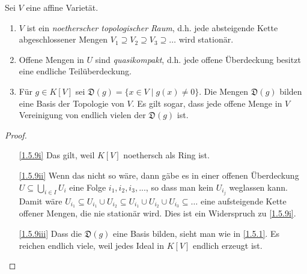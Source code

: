 \documentclass[a4paper,12pt]{scrbook}
\newtheorem{proof}{Beweis}
\newcommand{\D}{\mathfrak{D}}
\renewcommand{\dotsc}{\ensuremath{\!...}}
\begin{document}
\begin{bem}\label{1.5.9}
  Sei $V$ eine affine Varietät.
  \begin{enumerate}
  \item{} $V$ ist ein \emph{noetherscher topologischer Raum}, d.h. jede absteigende Kette abgeschlossener Mengen
    $V_1\supseteq V_2\supseteq V_3\supseteq\dotso$ wird stationär.
  \item{} Offene Mengen in $U$ sind \emph{quasikompakt}, d.h. jede offene Überdeckung besitzt eine endliche
    Teilüberdeckung.
  \item{} Für $g\in K[V]$ sei $\D(g)=\{x\in V\mid g(x)\neq0\}$. Die Mengen $\D(g)$ bilden eine Basis der Topologie
    von $V$. Es gilt sogar, dass jede offene Menge in $V$ Vereinigung von endlich vielen der $\D(g)$ ist.
  \end{enumerate}
\end{bem}
\begin{proof}
  \begin{enumerate}
  \item[\ref{1.5.9i}] Das gilt, weil $K[V]$ noethersch als Ring ist.
  \item[\ref{1.5.9ii}] Wenn das nicht so wäre, dann gäbe es in einer offenen Überdeckung $U\subseteq\bigcup_{i\in I}U_i$ eine
    Folge $i_1,i_2,i_3,\dotsc$, so dass man kein $U_{i_j}$ weglassen kann. Damit wäre $U_{i_1}\subseteq U_{i_1}\cup U_{i_2}
    \subseteq U_{i_1}\cup U_{i_2}\cup U_{i_3}\subseteq \dotso$ eine aufsteigende Kette offener Mengen, die nie stationär
    wird. Dies ist ein Widerspruch zu \ref{1.5.9i}.
  \item[\ref{1.5.9iii}] Dass die $\D(g)$ eine Basis bilden, sieht man wie in \cref{1.5.1}. Es reichen endlich viele, weil
    jedes Ideal in $K[V]$ endlich erzeugt ist.
  \end{enumerate}
\end{proof}

\end{document}
